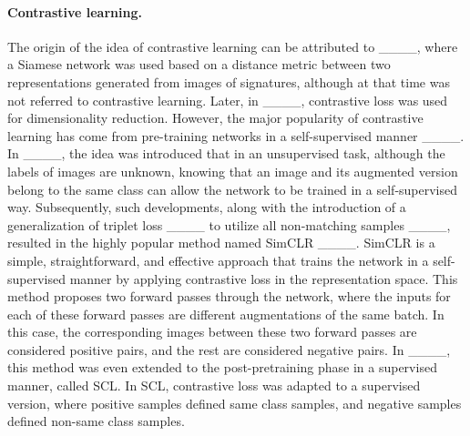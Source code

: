 \paragraph{Contrastive learning.} The origin of the idea of contrastive learning can be attributed to ____, where a Siamese network was used based on a distance metric between two representations generated from images of signatures, although at that time was not referred to contrastive learning. Later, in ____, contrastive loss was used for dimensionality reduction. However, the major popularity of contrastive learning has come from pre-training networks in a self-supervised manner ____. In ____, the idea was introduced that in an unsupervised task, although the labels of images are unknown, knowing that an image and its augmented version belong to the same class can allow the network to be trained in a self-supervised way. Subsequently, such developments, along with the introduction of a generalization of triplet loss ____ to utilize all non-matching samples ____, resulted in the highly popular method named SimCLR ____. SimCLR is a simple, straightforward, and effective approach that trains the network in a self-supervised manner by applying contrastive loss in the representation space. This method proposes two forward passes through the network, where the inputs for each of these forward passes are different augmentations of the same batch. In this case, the corresponding images between these two forward passes are considered positive pairs, and the rest are considered negative pairs. In ____, this method was even extended to the post-pretraining phase in a supervised manner, called SCL. In SCL, contrastive loss was adapted to a supervised version, where positive samples defined same class samples, and negative samples defined non-same class samples.
